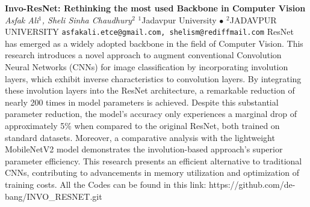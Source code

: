 
    \begin{conf-abstract}[]
        {\textbf{Invo-ResNet: Rethinking the most used Backbone in Computer Vision}}
        {\textit{Asfak Ali$^{1}$, Sheli Sinha Chaudhury$^{2}$}}
        {$^{1}$Jadavpur University $\bullet$ $^{2}$JADAVPUR UNIVERSITY}
        {\texttt{asfakali.etce@gmail.com, shelism@rediffmail.com}}
        {ResNet has emerged as a widely adopted backbone in the field of Computer Vision. This research introduces a novel approach to augment conventional Convolution Neural Networks (CNNs) for image classification by incorporating involution layers, which exhibit inverse characteristics to convolution layers. By integrating these involution layers into the ResNet architecture, a remarkable reduction of nearly 200 times in model parameters is achieved. Despite this substantial parameter reduction, the model's accuracy only experiences a marginal drop of approximately 5\% when compared to the original ResNet, both trained on standard datasets. Moreover, a comparative analysis with the lightweight MobileNetV2 model demonstrates the involution-based approach's superior parameter efficiency. This research presents an efficient alternative to traditional CNNs, contributing to advancements in memory utilization and optimization of training costs. All the Codes can be found in this link: https://github.com/de-bang/INVO\_RESNET.git}
    \end{conf-abstract}
        